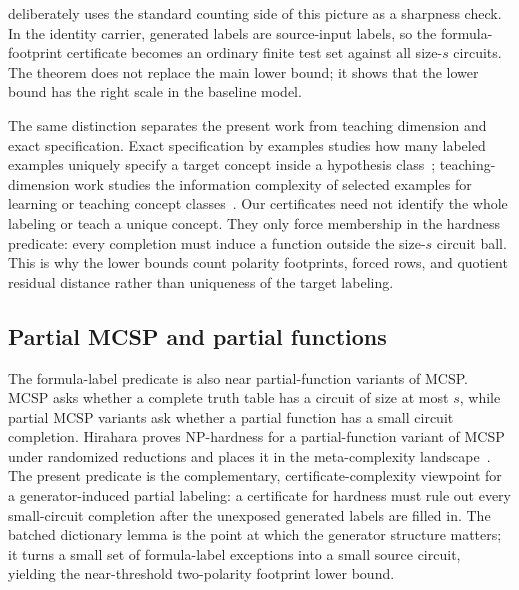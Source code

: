 \documentclass[11pt]{article}
\theoremstyle{definition}
\begin{document}
 deliberately uses the standard counting side of this picture as a sharpness check.  In the identity carrier, generated labels are source-input labels, so the formula-footprint certificate becomes an ordinary finite test set against all size-\(s\) circuits.  The theorem does not replace the main lower bound; it shows that the lower bound has the right scale in the baseline model.

The same distinction separates the present work from teaching dimension and exact specification.  Exact specification by examples studies how many labeled examples uniquely specify a target concept inside a hypothesis class~\cite{AnthonyBCS92}; teaching-dimension work studies the information complexity of selected examples for learning or teaching concept classes~\cite{DoliwaFSZ14}.  Our certificates need not identify the whole labeling or teach a unique concept.  They only force membership in the hardness predicate: every completion must induce a function outside the size-\(s\) circuit ball.  This is why the lower bounds count polarity footprints, forced rows, and quotient residual distance rather than uniqueness of the target labeling.

\subsection{Partial MCSP and partial functions}

The formula-label predicate is also near partial-function variants of MCSP.  MCSP asks whether a complete truth table has a circuit of size at most \(s\), while partial MCSP variants ask whether a partial function has a small circuit completion.  Hirahara proves NP-hardness for a partial-function variant of MCSP under randomized reductions and places it in the meta-complexity landscape~\cite{Hirahara22PartialMCSP}.  The present predicate is the complementary, certificate-complexity viewpoint for a generator-induced partial labeling: a certificate for hardness must rule out every small-circuit completion after the unexposed generated labels are filled in.  The batched dictionary lemma is the point at which the generator structure matters; it turns a small set of formula-label exceptions into a small source circuit, yielding the near-threshold two-polarity footprint lower bound.
\end{document}
